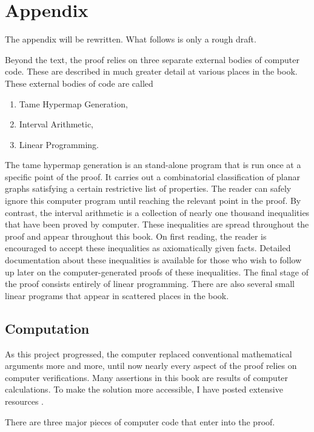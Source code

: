 \chapter{Appendix}

\begin{note}%
The appendix will be rewritten.  What follows is only a rough draft.
\end{note}

Beyond the text, the proof relies on three separate external bodies of
computer code.  These are described in much greater detail at various
places in the book.  These external bodies of code are called
\begin{enumerate}
\item Tame Hypermap Generation,
\item Interval Arithmetic,
\item Linear Programming.
\end{enumerate}
The tame hypermap generation is an stand-alone program that is run
once at a specific point of the proof.  It carries out a combinatorial
classification of planar graphs satisfying a certain restrictive list
of properties.  The reader can safely ignore this computer program
until reaching the relevant point in the proof.  By contrast, the
interval arithmetic is a collection of nearly one thousand
inequalities that have been proved by computer.  These inequalities
are spread throughout the proof and appear throughout this book.  On
first reading, the reader is encouraged to accept these inequalities
as axiomatically given facts.  Detailed documentation about these
inequalities is available for those who wish to follow up later on the
computer-generated proofs of these inequalities.  The final stage of
the proof consists entirely of linear programming.  There are also
several small linear programs that appear in scattered places in the
book.

\section{Computation}

As this project  progressed, the computer  replaced conventional
mathematical arguments more and more, until now
nearly every aspect of the proof relies on
computer verifications.  Many assertions in this book
are results of computer calculations.
To make the solution more accessible, I have
posted extensive resources \cite{web}.

There are three major pieces of computer code that enter into the proof.

